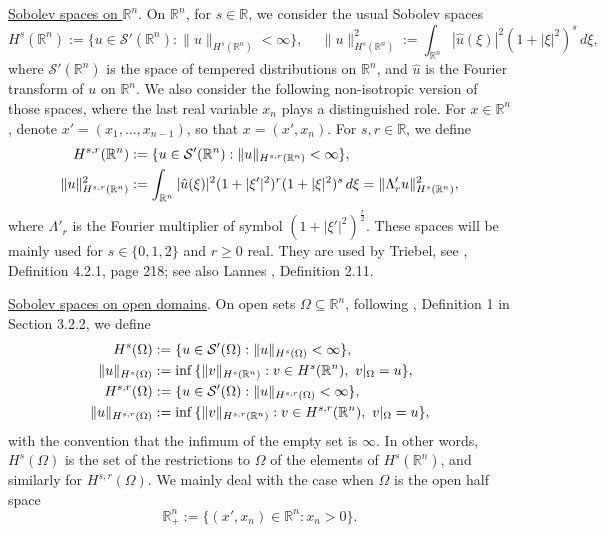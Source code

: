 \documentclass[10pt,reqno,a4paper]{article}
\numberwithin{equation}{section}
\theoremstyle{plain}
\theoremstyle{definition}
\newcommand{\R}{{\mathbb R}}
\newcommand{\mS}{\mathcal{S}}
\newcommand{\Lm}{\Lambda}
\newcommand{\Om}{\Omega}
\begin{document}
\medskip

\underline{Sobolev spaces on $\R^n$}.
On $\R^n$, for $s \in \R$, we consider the usual Sobolev spaces 
\begin{equation}  \label{def.H.s.classical}
H^s(\R^n) := \{ u \in \mS'(\R^n) : \| u \|_{H^s(\R^n)} < \infty \}, \quad \ 
\| u \|_{H^s(\R^n)}^2 := \int_{\R^n} | \hat u(\xi) |^2 (1 + |\xi|^2)^s \, d\xi,
\end{equation}
where $\mS'(\R^n)$ is the space of tempered distributions on $\R^n$, 
and $\hat u$ is the Fourier transform of $u$ on $\R^n$. 
We also consider the following non-isotropic version of those spaces, 
where the last real variable $x_n$ plays a distinguished role.
For $x \in \R^n$, denote $x' = (x_1, \ldots, x_{n-1})$, so that $x = (x', x_n)$. 
For $s,r \in \R$, we define 
\begin{align}  
H^{s,r}(\R^n) 
& := \{ u \in \mS'(\R^n) : \| u \|_{H^{s,r}(\R^n)} < \infty \}, 
\notag \\ 
\| u \|_{H^{s,r}(\R^n)}^2 
& := \int_{\R^n} | \hat u(\xi) |^2 (1 + |\xi'|^2)^r (1 + |\xi|^2)^s \, d\xi 
= \| \Lm'_r u \|_{H^s(\R^n)}^2,
\label{def.X.s.m}
\end{align}
where $\Lm'_r$ is the Fourier multiplier of symbol $(1 + |\xi'|^2)^{\frac{r}{2}}$.  
These spaces will be mainly used for $s \in \{ 0, 1, 2 \}$ and $r \geq 0$ real. 
They are used by Triebel, see \cite{Triebel.1983}, Definition 4.2.1, page 218; 
see also Lannes \cite{Lannes.book}, Definition 2.11.

\medskip

\underline{Sobolev spaces on open domains}. 
On open sets $\Om \subseteq \R^n$, following \cite{Triebel.1983}, 
Definition 1 in Section 3.2.2, we define 
\begin{align}  
H^s(\Om) 
& := \{ u \in \mS'(\Om) : \| u \|_{ H^s(\Om) } < \infty \},
\notag \\
\| u \|_{ H^s(\Om) } 
& := \inf \, \{ \| v \|_{H^s(\R^n)} : v \in H^s(\R^n), \ v |_{\Om} = u \},
\label{def.H.s.Om} 
\\
H^{s,r}(\Om) 
& := \{ u \in \mS'(\Om) : \| u \|_{H^{s,r}(\Om)} < \infty \}, 
\notag \\
\| u \|_{ H^{s,r}(\Om) } 
& := \inf \, \{ \| v \|_{H^{s,r}(\R^n)} : v \in H^{s,r}(\R^n), \ v |_{\Om} = u \},
\label{def.H.s.r.Om} 
\end{align}
with the convention that the infimum of the empty set is $\infty$. 
In other words, $H^s(\Om)$ is the set of the restrictions to $\Om$ of the elements of $H^s(\R^n)$, 
and similarly for $H^{s,r}(\Om)$.  
We mainly deal with the case when $\Om$ is the open half space 
\begin{equation}  \label{def.R.n.+} 
\R^n_+ := \{ (x', x_n) \in \R^n : x_n > 0 \}. 
\end{equation}
\end{document}
